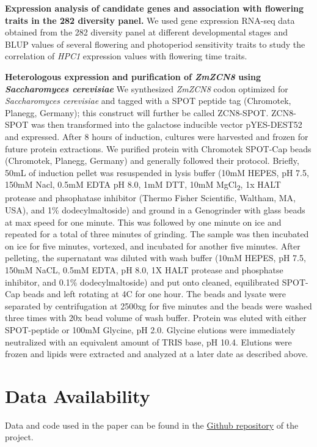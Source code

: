 \documentclass[9pt,twocolumn,twoside,lineno]{biorxiv}
\begin{document}
\textbf{Expression analysis of candidate genes and association with flowering traits in the 282 diversity panel.}
We used gene expression RNA-seq data obtained from the 282 diversity panel at different developmental stages \cite{Kremling2018-gn} and BLUP values of several flowering and photoperiod sensitivity traits \cite{Hung2012-ms} to study the correlation of \textit{HPC1} expression values with flowering time traits.  

\textbf{Heterologous expression and purification of \textit{ZmZCN8} using \textit{Saccharomyces cerevisiae}}
We synthesized \textit{ZmZCN8} codon optimized for \textit{Saccharomyces cerevisiae} and tagged with a SPOT peptide tag (Chromotek, Planegg, Germany); this construct will further be called ZCN8-SPOT. 
ZCN8-SPOT was then transformed into the galactose inducible vector pYES-DEST52 and expressed. 
After 8 hours of induction, cultures were harvested and frozen for future protein extractions. 
We purified protein with Chromotek SPOT-Cap beads (Chromotek, Planegg, Germany) and generally followed their protocol. 
Briefly, 50mL of induction pellet was resuspended in lysis buffer (10mM HEPES, pH 7.5, 150mM Nacl, 0.5mM EDTA pH 8.0, 1mM DTT, 10mM MgCl\textsubscript{2}, 1x HALT protease and phsophatase inhibitor (Thermo Fisher Scientific, Waltham, MA, USA), and 1\% dodecylmaltoside) and ground in a Genogrinder with glass beads at max speed for one minute.
This was followed by one minute on ice and repeated for a total of three minutes of grinding.
The sample was then incubated on ice for five minutes, vortexed, and incubated for another five minutes. 
After pelleting, the supernatant was diluted with wash buffer (10mM HEPES, pH 7.5, 150mM NaCL, 0.5mM EDTA, pH 8.0, 1X HALT protease and phosphatse inhibitor, and 0.1\% dodecylmaltoside) and put onto cleaned, equilibrated SPOT-Cap beads and left rotating at 4\textdegree C for one hour.
The beads and lysate were separated by centrifugation at 2500xg for five minutes and the beads were washed three times with 20x bead volume of wash buffer. 
Protein was eluted with either SPOT-peptide or 100mM Glycine, pH 2.0. 
Glycine elutions were immediately neutralized with an equivalent amount of TRIS base, pH 10.4.
Elutions were frozen and lipids were extracted and analyzed at a later date as described above.

\section{Data Availability}
Data and code used in the paper can be found in the \href{https://github.com/sawers-rellan-labs/High-PC1-paper}{Github repository} of the project. 
\end{document}
